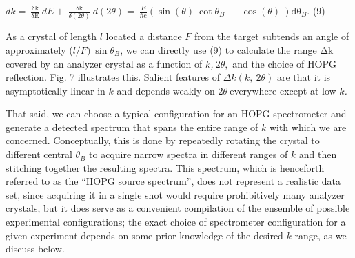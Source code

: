 \(dk = \ \frac{\text{δk}}{\text{δE}}\ dE + \ \frac{\text{δk}}{\delta(2\theta)}\ d(2\theta) = \ \frac{E}{\text{ℏc}}\left( \sin{(\theta)\ \cot{\theta_{B}\  - \ \cos{(\theta)}}}\  \right)\text{dθ}_{B}\).
(9)

As a crystal of length \(l\) located a distance \(F\) from the target
subtends an angle of approximately (\(l/F)\ \sin\theta_{B}\), we can
directly use (9) to calculate the range \(\text{Δk}\) covered by an
analyzer crystal as a function of \(k\)\emph{,}\(\ 2\theta,\) and the
choice of HOPG reflection. Fig. 7 illustrates this. Salient features of
\(\Delta k(k,\ 2\theta)\) are that it is asymptotically linear in \(k\)
and depends weakly on \(2\theta\ \)everywhere except at low
\(k\)\emph{.}

That said, we can choose a typical configuration for an HOPG
spectrometer and generate a detected spectrum that spans the entire
range of \(k\) with which we are concerned. Conceptually, this is done
by repeatedly rotating the crystal to different central \(\theta_{B}\)
to acquire narrow spectra in different ranges of \(k\) and then
stitching together the resulting spectra. This spectrum, which is
henceforth referred to as the ``HOPG source spectrum'', does not
represent a realistic data set, since acquiring it in a single shot
would require prohibitively many analyzer crystals, but it does serve as
a convenient compilation of the ensemble of possible experimental
configurations; the exact choice of spectrometer configuration for a
given experiment depends on some prior knowledge of the desired \(k\)
range, as we discuss below.

